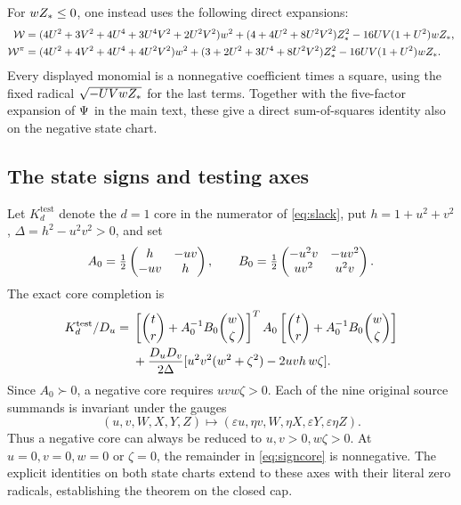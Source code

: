 For $wZ_*\leq0$, one instead uses the following direct expansions:
\begin{align}
 \mathcal W={}&(4U^2+3V^2+4U^4+3U^4V^2+2U^2V^2)w^2
 +(4+4U^2+8U^2V^2)Z_*^2
             -16UV(1+U^2)wZ_*,\notag\\
 \mathcal W^\pi={}&(4U^2+4V^2+4U^4+4U^2V^2)w^2
 +(3+2U^2+3U^4+8U^2V^2)Z_*^2
             -16UV(1+U^2)wZ_* .
 \label{eq:negativeW}
\end{align}
Every displayed monomial is a nonnegative coefficient times a square,
using the fixed radical $\sqrt{-UVwZ_*}$ for the last terms.
Together with the five-factor expansion of $\Psi$ in the main text, these
give a direct sum-of-squares identity also on the negative state chart.

\subsection*{The state signs and testing axes}
Let $K_d^{\mathrm{test}}$ denote the $d=1$ core in the numerator
of \eqref{eq:slack}, put $h=1+u^2+v^2$,
$\Delta=h^2-u^2v^2>0$, and set
\[
 A_0=\tfrac12\begin{pmatrix}h&-uv\\-uv&h\end{pmatrix},\qquad
 B_0=\tfrac12\begin{pmatrix}-u^2v&-uv^2\\uv^2&u^2v\end{pmatrix}.
\]
The exact core completion is
\begin{align}
 K_d^{\mathrm{test}}/D_u
 ={}&\left[\binom tr+A_0^{-1}B_0\binom w\zeta\right]^TA_0
 \left[\binom tr+A_0^{-1}B_0\binom w\zeta\right]\notag\\
 &+\frac{D_uD_v}{2\Delta}
      [u^2v^2(w^2+\zeta^2)-2uvh\,w\zeta] .
 \label{eq:signcore}
\end{align}
Since $A_0\succ0$, a negative core requires $uvw\zeta>0$.
Each of the nine original source summands is invariant under the gauges
\[
 (u,v,W,X,Y,Z)\longmapsto
 (\varepsilon u,\eta v,W,\eta X,\varepsilon Y,\varepsilon\eta Z).
\]
Thus a negative core can always be reduced to $u,v>0,w\zeta>0$.
At $u=0,v=0,w=0$ or $\zeta=0$, the remainder in \eqref{eq:signcore}
is nonnegative. The explicit identities on both state charts extend to these axes
with their literal zero radicals, establishing the theorem on the closed cap.
